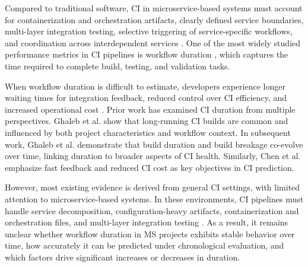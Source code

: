 \documentclass[conference]{IEEEconf}
\begin{document}
Compared to traditional software, CI in microservice-based systems must account for containerization and orchestration artifacts, clearly defined service boundaries, multi-layer integration testing, selective triggering of service-specific workflows, and coordination across interdependent services \cite{newman2021building,taibi2019continuous,baresi2022docker,reile2022bunk8s}. One of the most widely studied performance metrics in CI pipelines is workflow duration \cite{ghaleb2019longbuild,ghaleb2023interplay,Bisong2017BuildTimeModels,Wu2022DockerBuildDuration,Gallaba2022CircleCI}, which captures the time required to complete build, testing, and validation tasks.

When workflow duration is difficult to estimate, developers experience longer waiting times for integration feedback, reduced control over CI efficiency, and increased operational cost \cite{ghaleb2019longbuild,Chen2020BuildFast}. Prior work has examined CI duration from multiple perspectives. Ghaleb et al. \cite{ghaleb2019longbuild} show that long-running CI builds are common and influenced by both project characteristics and workflow context. In subsequent work, Ghaleb et al. \cite{ghaleb2023interplay} demonstrate that build duration and build breakage co-evolve over time, linking duration to broader aspects of CI health. Similarly, Chen et al. \cite{Chen2020BuildFast} emphasize fast feedback and reduced CI cost as key objectives in CI prediction.

However, most existing evidence is derived from general CI settings, with limited attention to microservice-based systems. In these environments, CI pipelines must handle service decomposition, configuration-heavy artifacts, containerization and orchestration files, and multi-layer integration testing \cite{newman2021building,taibi2019continuous,baresi2022docker,reile2022bunk8s}. As a result, it remains unclear whether workflow duration in MS projects exhibits stable behavior over time, how accurately it can be predicted under chronological evaluation, and which factors drive significant increases or decreases in duration.
\end{document}
